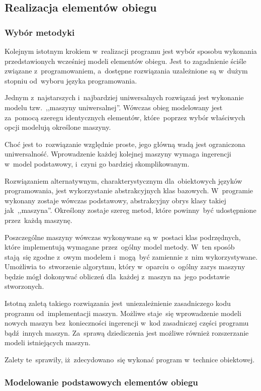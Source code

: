 \subsection{Realizacja elementów obiegu}

\subsubsection{Wybór metodyki}

Kolejnym istotnym krokiem w~realizacji programu jest wybór sposobu
wykonania przedstawionych wcześniej modeli elementów obiegu. Jest to
zagadnienie ściśle związane z~programowaniem, a~dostępne rozwiązania
uzależnione są w~dużym stopniu od~wyboru języka programowania.

Jednym z~najstarszych i~najbardziej uniwersalnych rozwiązań jest
wykonanie modelu tzw.~,,maszyny uniwersalnej''. Wówczas obieg modelowany
jest za~pomocą szeregu identycznych elementów, które~poprzez wybór
właściwych opcji modelują określone maszyny.

Choć jest to~rozwiązanie względnie proste, jego główną wadą jest
ograniczona uniwersalność. Wprowadzenie każdej kolejnej maszyny wymaga
ingerencji w~model podstawowy, i~czyni go bardziej skomplikowanym.

Rozwiązaniem alternatywnym, charakterystycznym dla~obiektowych języków
programowania, jest wykorzystanie abstrakcyjnych klas bazowych.
W~programie wykonany zostaje wówczas podstawowy, abstrakcyjny obrys
klasy takiej jak~,,maszyna''. Określony zostaje szereg metod, które
powinny~być udostępnione przez~każdą maszynę.

Poszczególne maszyny wówczas wykonywane są w~postaci klas podrzędnych,
które implementują wymagane przez~ogólny model metody. W~ten sposób
stają~się zgodne z~owym modelem i~mogą~być zamiennie z~nim
wykorzystywane. Umożliwia to~stworzenie algorytmu, który w~oparciu
o~ogólny zarys maszyny będzie mógł dokonywać obliczeń dla~każdej
z~maszyn na~jego podstawie stworzonych.

Istotną zaletą takiego rozwiązania jest~uniezależnienie zasadniczego
kodu programu od~implementacji maszyn. Możliwe staje~się wprowadzenie
modeli nowych maszyn bez~konieczności ingerencji w~kod zasadniczej
części programu bądź~innych maszyn. Za~sprawą dziediczenia jest możliwe
również rozszerzanie modeli istniejących maszyn.

Zalety te~sprawiły, iż~zdecydowano~się wykonać program w~technice
obiektowej.


\subsubsection{Modelowanie podstawowych elementów obiegu}

